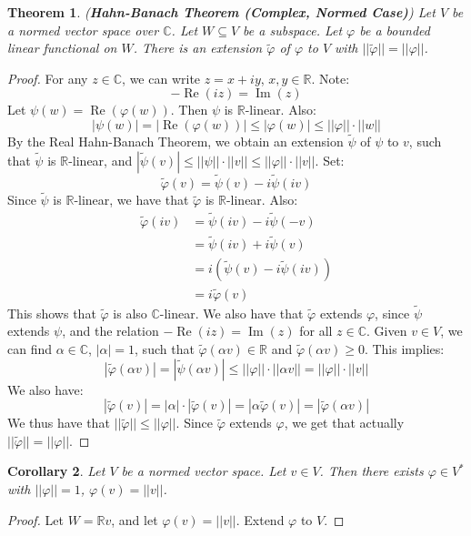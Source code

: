 \documentclass[a4paper,12pt]{report}
\newcommand{\real} { \operatorname{Re} }
\newcommand{\imag} { \operatorname{Im} }
\newcommand{\sse} {\subseteq}
\newcommand{\vphi} {\varphi}
\newtheorem{theorem}{Theorem}[section]
\newtheorem{corollary}[theorem]{Corollary}
\begin{document}
	\begin{theorem}
	\emph{(\textbf{Hahn-Banach Theorem (Complex, Normed Case)})}
	Let $V$ be a normed vector space over $\mathbb{C}$. Let $W \sse V$ be a subspace. Let $\vphi$ be a bounded linear functional on $W$. There is an extension $\tilde{\vphi}$ of $\vphi$ to $V$ with $||\tilde{\vphi}|| = ||\vphi||$. 
	\end{theorem}
	\begin{proof}
	For any $z \in \mathbb{C}$, we can write $z = x + iy$, $x, y \in \mathbb{R}$. Note:
	\[ -\real (iz) = \imag (z) \]
	Let $\psi(w) = \real (\vphi(w))$. Then $\psi$ is $\mathbb{R}$-linear. Also:
	\[ |\psi(w)| = |\real(\vphi(w))| \leq |\vphi(w)| \leq ||\vphi|| \cdot ||w|| \]
	By the Real Hahn-Banach Theorem, we obtain an extension $\tilde{\psi}$ of $\psi$ to $v$, such that $\tilde{\psi}$ is $\mathbb{R}$-linear, and $|\tilde{\psi}(v)| \leq ||\psi||\cdot||v|| \leq ||\vphi|| \cdot ||v||$. Set:
	\[ \tilde{\vphi}(v) = \tilde{\psi}(v) -i\tilde{\psi}(iv) \]
	Since $\tilde{\psi}$ is $\mathbb{R}$-linear, we have that $\tilde{\vphi}$ is $\mathbb{R}$-linear. Also:
	\begin{align*}
	\tilde{\vphi}(iv) &= \tilde{\psi}(iv) - i \tilde{\psi}(-v) \\
	&= \tilde{\psi}(iv) + i \tilde{\psi}(v) \\
	&= i(\tilde{\psi}(v) - i\tilde{\psi}(iv)) \\
	&= i \tilde{\vphi}(v)
	\end{align*}
	This shows that $\tilde{\vphi}$ is also $\mathbb{C}$-linear. We also have that $\tilde{\vphi}$ extends $\vphi$, since $\tilde{\psi}$ extends $\psi$, and the relation $-\real(iz) = \imag(z)$ for all $z \in \mathbb{C}$. Given $v \in V$, we can find $\alpha \in \mathbb{C}$, $|\alpha| = 1$, such that $\tilde{\vphi}(\alpha v) \in \mathbb{R}$ and $\tilde{\vphi}(\alpha v) \geq 0$. This implies:
	\[ |\tilde{\vphi}(\alpha v)| = |\tilde{\psi}(\alpha v)| \leq ||\varphi|| \cdot ||\alpha v|| = ||\varphi|| \cdot ||v|| \]
	We also have:
	\[ |\tilde{\vphi}(v)| = |\alpha|\cdot |\tilde{\vphi}(v)| = |\alpha \tilde{\vphi}(v)| = |\tilde{\vphi}(\alpha v)| \]
	We thus have that $||\tilde{\vphi}|| \leq ||\vphi||$. Since $\tilde{\vphi}$ extends $\vphi$, we get that actually $||\tilde{\vphi}|| = ||\vphi||$. 
	\end{proof}
	
	\begin{corollary}
	Let $V$ be a normed vector space. Let $v \in V$. Then there exists $\vphi \in V^*$ with $||\vphi|| = 1$, $\vphi(v) = ||v||$. 
	\end{corollary}
	\begin{proof}
	Let $W = \mathbb{R}v$, and let $\vphi(v) = ||v||$. Extend $\vphi$ to $V$. 
	\end{proof}
	
\end{document}
